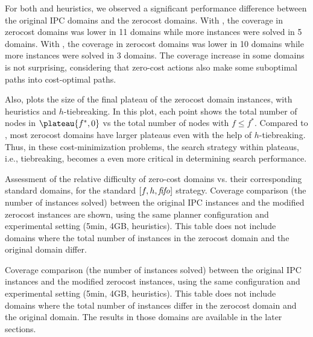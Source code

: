 For both \lmcut and \mands heuristics, we observed a significant
performance difference between the original IPC domains and the zerocost
domains. With \lmcut, the coverage in zerocost domains
was lower in 11 domains while more instances were solved
in 5 domains. With \mands, the coverage in zerocost domains was lower in 10 domains while
more instances were solved in 3 domains.
The coverage increase in some domains is not surprising, considering that zero-cost actions also make some suboptimal paths into cost-optimal paths.

Also,  plots the size of the final plateau of the
zerocost domain instances, with \lmcut heuristics and $h$-tiebreaking. In this plot,
each point shows the total number of nodes in $\plateau{f^*,0}$ vs the
total number of nodes with $f\leq f^*$. Compared to ,
most zerocost domains have larger plateaus even with the help of
$h$-tiebreaking.  Thus, in these cost-minimization problems, the search
strategy within plateaus, i.e., tiebreaking, becomes a even more critical
in determining search performance.


\begin{table}[htbp]
 \centering
 
 \caption{
 Assessment of the relative difficulty of zero-cost domains vs. their corresponding standard domains, for the standard $[f,h,{\text{\textit{fifo}}}]$ strategy.
 Coverage comparison (the number of instances solved) 
 between the original IPC instances and the modified zerocost instances are shown, 
 using the same planner configuration and experimental setting (5min, 4GB, \lmcut heuristics).
 This table does not include domains where the total number of instances
 in the zerocost domain  and the original domain differ. 
 }
 \label{tbl:lmcut-zerocost-std}
\end{table}

\begin{table}[htbp]
 \centering
 
 \caption{
 Coverage comparison (the number of instances solved) 
 between the original IPC instances and the modified zerocost instances,
 using the same configuration and experimental setting (5min, 4GB, \mands heuristics).
 This table does not include domains where the total number of instances
 differ in the zerocost domain and the original domain. The results in
 those domains are available in the later sections.
 }
 \label{tbl:mands-zerocost-std}
\end{table}

